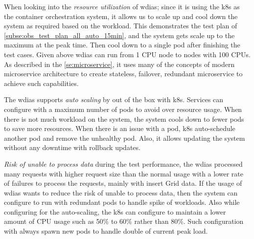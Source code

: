 When looking into the \emph{resource utilization} of \acrshort{wdias}; since it is using the \acrshort{k8s} as the container orchestration system, it allows us to scale up and cool down the system as required based on the workload. This demonstrates the test plan of \cref{subse:obs_test_plan_all_auto_15min}, and the system gets scale up to the maximum at the peak time. Then cool down to a single pod after finishing the test cases.
Given above \acrshort{wdias} can run from 1 CPU node to nodes with 100 CPUs. As described in the \cref{se:microservice}, it uses many of the concepts of modern microservice architecture to create stateless, failover, redundant microservice to achieve such capabilities.

The \acrshort{wdias} supports \emph{auto scaling} by out of the box with \acrshort{k8s}. Services can configure with a maximum number of pods to avoid over resource usage. When there is not much workload on the system, the system cools down to fewer pods to save more resources. When there is an issue with a pod, \acrshort{k8s} auto-schedule another pod and remove the unhealthy pod. Also, it allows updating the system without any downtime with rollback updates.

\emph{Risk of unable to process data} during the test performance, the \acrshort{wdias} processed many requests with higher request size than the normal usage with a lower rate of failures to process the requests, mainly with insert Grid data. If the usage of \acrshort{wdias} wants to reduce the risk of unable to process data, then the system can configure to run with redundant pods to handle spike of workloads. Also while configuring for the auto-scaling, the \acrshort{k8s} can configure to maintain a lower amount of CPU usage such as 50\% to 60\% rather  than 80\%. Such configuration with always spawn new pods to handle double of current peak load.
